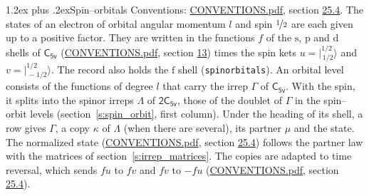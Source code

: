 \documentclass[10pt,a4paper]{article}
\makeatletter
\renewcommand\section{\@startsection{section}{1}{\z@}{-3ex plus -1ex minus -.2ex}%
  {1.2ex plus .2ex}{\normalfont\large\sffamily\bfseries\color{parttitle}}}
\numberwithin{equation}{section}
\newcommand{\grp}[1]{\mathsf{#1}}
\newcommand{\orbital}[1]{\mathrm{#1}}
\newcommand{\mult}{\kappa}
\newcommand{\intx}{\mu}
\newcommand{\jm}[2]{\bigl\lvert{}^{#1}_{\,#2}\bigr\rangle}
\makeatother
\begin{document}
\section{Spin--orbitals}\label{s:spin_orbitals}
Conventions: \href{../../CONVENTIONS.pdf}{CONVENTIONS.pdf}, section \href{../../CONVENTIONS.pdf\#conv.25.4}{25.4}.
\leavevmode\label{n:index.orbital.l}The states of an electron of orbital angular momentum $l$ and spin $\nicefrac{1}{2}$ are each given up to a positive factor. \label{n:local.spinor.uv}\label{n:local.function.f}They are written in the functions $f$ of the $\orbital{s}$, $\orbital{p}$ and $\orbital{d}$ shells of \href{../../../rotation/data/pdf/C5v.pdf}{$\grp{C_{5v}}$} (\href{../../CONVENTIONS.pdf}{CONVENTIONS.pdf}, section \href{../../../rotation/CONVENTIONS.pdf\#conv.13}{13}) times the spin kets $u = \jm{1/2}{1/2}$ and $v = \jm{1/2}{-1/2}$. The record also holds the $\orbital{f}$ shell (\texttt{spinorbitals}). An orbital level consists of the functions of degree $l$ that carry the irrep $\Gamma$ of \href{../../../rotation/data/pdf/C5v.pdf}{$\grp{C_{5v}}$}. With the spin, it splits into the spinor irreps $\Lambda$ of $\grp{2C_{5v}}$, those of the doublet of $\Gamma$ in the spin--orbit levels (section~\ref{s:spin_orbit}, first column). \label{n:head.state}Under the heading of its shell, a row gives $\Gamma$, a copy $\mult$ of $\Lambda$ (when there are several), its partner $\intx$ and the state. The normalized state (\href{../../CONVENTIONS.pdf}{CONVENTIONS.pdf}, section \href{../../CONVENTIONS.pdf\#conv.25.4}{25.4}) follows the partner law with the matrices of section~\ref{s:irrep_matrices}. The copies are adapted to time reversal, which sends $f u$ to $f v$ and $f v$ to $-f u$ (\href{../../CONVENTIONS.pdf}{CONVENTIONS.pdf}, section \href{../../CONVENTIONS.pdf\#conv.25.4}{25.4}).
\end{document}
